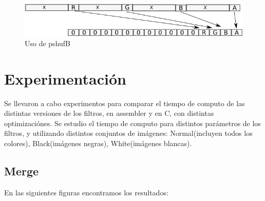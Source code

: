 \documentclass[a4paper]{article}
\begin{document}
\begin{figure}[H]
\centering
\includegraphics[scale=0.8]{imagenes/shufle.png}
\caption{Uso de pshufB}
\label{lshValue}
\end{figure}



\section{Experimentación}

Se llevaron a cabo experimentos para comparar el tiempo de computo de las distintas versiones de los filtros, en assembler y en C, con distintas optimizaciónes. Se estudio el tiempo de computo para distintos parámetros de los filtros, y utilizando distintos conjuntos de imágenes: Normal(incluyen todos los colores), Black(imágenes negras), White(imágenes blancas).


\subsection{Merge}

En las siguientes figuras encontramos los resultados:
\end{document}
